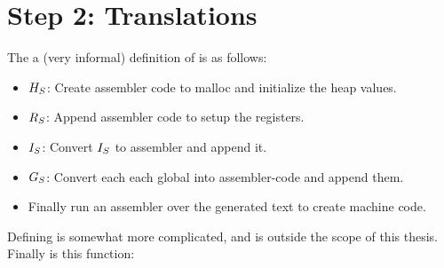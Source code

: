 \section{Step 2: Translations}

The a (very informal) definition of \simple\embed is as follows:

\begin{itemize}
\item ${H_S}$: Create assembler code to malloc and initialize the heap
  values.
\item ${R_S}$: Append assembler code to setup the registers.
\item ${I_S}$: Convert ${I_S}$ to assembler and append it.
\item ${G_S}$: Convert each each global into assembler-code and append them.
\item Finally run an assembler over the generated text to create machine code.
\end{itemize}

Defining \simple\embedp is somewhat more complicated, and is outside the scope
of this thesis. Finally \high\embed is this function:

